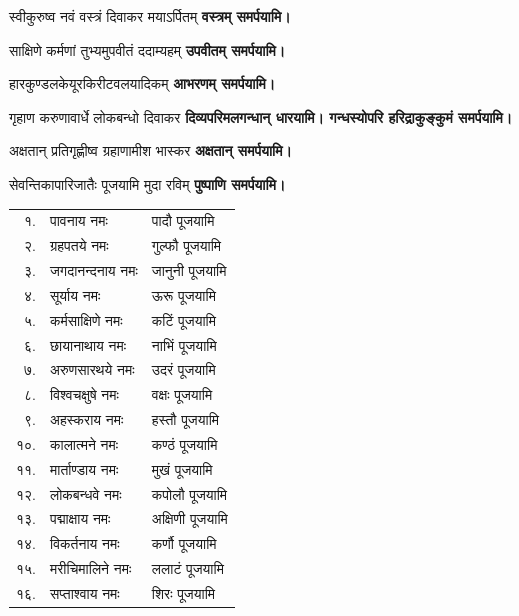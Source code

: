\begin{center}
{स्वीकुरुष्व नवं वस्त्रं दिवाकर मयाऽर्पितम्}
\textbf{\devAya{} वस्त्रम् समर्पयामि।}

{साक्षिणे कर्मणां तुभ्यमुपवीतं ददाम्यहम्}
\textbf{\devAya{} उपवीतम् समर्पयामि।}

{हारकुण्डलकेयूरकिरीटवलयादिकम्}
\textbf{\devAya{} आभरणम् समर्पयामि।}

{गृहाण करुणावार्धे लोकबन्धो दिवाकर}
\textbf{\devAya{} दिव्यपरिमलगन्धान् धारयामि। गन्धस्योपरि हरिद्राकुङ्कुमं समर्पयामि।}

{अक्षतान् प्रतिगृह्णीष्व ग्रहाणामीश भास्कर}
\textbf{\devAya{} अक्षतान् समर्पयामि।}

{सेवन्तिकापारिजातैः पूजयामि मुदा रविम्}
\textbf{\devAya{} पुष्पाणि समर्पयामि।}

\begin{longtable}{rl@{ — }l}
१. & पावनाय नमः & पादौ पूजयामि\\
२. & ग्रहपतये नमः & गुल्फौ पूजयामि\\
३. & जगदानन्दनाय नमः & जानुनी पूजयामि\\
४. & सूर्याय नमः & ऊरू पूजयामि\\
५. & कर्मसाक्षिणे नमः & कटिं पूजयामि\\
६. & छायानाथाय नमः & नाभिं पूजयामि\\
७. & अरुणसारथये नमः & उदरं पूजयामि\\
८. & विश्वचक्षुषे नमः & वक्षः पूजयामि\\
९. & अहस्कराय नमः & हस्तौ पूजयामि\\
१०. & कालात्मने नमः & कण्ठं पूजयामि\\
११. & मार्ताण्डाय नमः & मुखं पूजयामि\\
१२. & लोकबन्धवे नमः & कपोलौ पूजयामि\\
१३. & पद्माक्षाय नमः & अक्षिणी पूजयामि\\
१४. & विकर्तनाय नमः & कर्णौ पूजयामि\\
१५. & मरीचिमालिने नमः & ललाटं पूजयामि\\
१६. & सप्ताश्वाय नमः & शिरः पूजयामि\\
\end{longtable}




\end{center}
